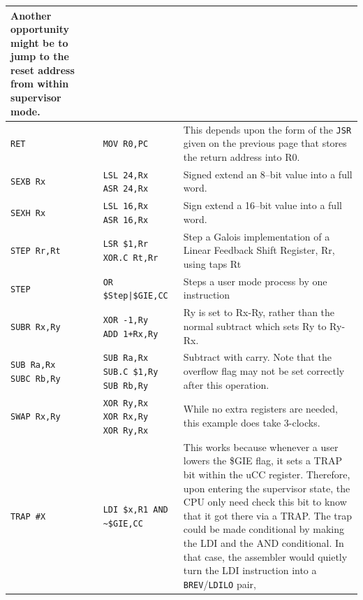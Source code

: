 \documentclass{gqtekspec}
\begin{document}
\begin{table}
\begin{center}
\begin{tabular}{p{1.0in}p{1.5in}p{3.2in}}
	Another opportunity might be to jump to the reset address from within
	supervisor mode.\\\hline
{\tt RET} & {\tt MOV R0,PC}
	& This depends upon the form of the {\tt JSR} given on the previous
	page that stores the return address into R0.
	\\\hline
{\tt SEXB Rx }
	& \parbox[t]{1.5in}{\tt LSL 24,Rx \\ ASR 24,Rx}
	& Signed extend an 8--bit value into a full word.\\\hline
{\tt SEXH Rx }	
	& \parbox[t]{1.5in}{\tt LSL 16,Rx \\ ASR 16,Rx}
	& Sign extend a 16--bit value into a full word.\\\hline
{\tt STEP Rr,Rt}
	& \parbox[t]{1.5in}{\tt LSR \$1,Rr \\ XOR.C Rt,Rr}
	& Step a Galois implementation of a Linear Feedback Shift Register, Rr,
		using taps Rt \\\hline
{\tt STEP}
	& \parbox[t]{1.5in}{\tt OR \$Step|\$GIE,CC}
	& Steps a user mode process by one instruction\\\hline
{\tt SUBR Rx,Ry }
	& \parbox[t]{1.5in}{\tt XOR -1,Ry\\ADD 1+Rx,Ry} 
	& Ry is set to Rx-Ry, rather than the normal subtract which
	sets Ry to Ry-Rx. \\\hline
\parbox[t]{1.4in}{\tt SUB Ra,Rx\\SUBC Rb,Ry}
	& \parbox[t]{1.5in}{\tt SUB Ra,Rx\\SUB.C \$1,Ry\\SUB Rb,Ry}
	& Subtract with carry.  Note that the overflow flag may not be
	set correctly after this operation.\\\hline
{\tt SWAP Rx,Ry }
	& \parbox[t]{1.5in}{\tt XOR Ry,Rx \\ XOR Rx,Ry \\ XOR Ry,Rx} 
	& While no extra registers are needed, this example
	does take 3-clocks. \\\hline
{\tt TRAP \#X}
	& \parbox[t]{1.5in}{\tt LDI \$x,R1 \\ AND \textasciitilde\$GIE,CC }
	& This works because whenever a user lowers the \$GIE flag, it sets
	a TRAP bit within the uCC register.  Therefore, upon entering the 
	supervisor state, the CPU only need check this bit to know that it
	got there via a TRAP.  The trap could be made conditional by making
	the LDI and the AND conditional.  In that case, the assembler would
	quietly turn the LDI instruction into a {\tt BREV}/{\tt LDILO} pair,

\end{tabular}
\end{center}
\end{table}
\end{document}
